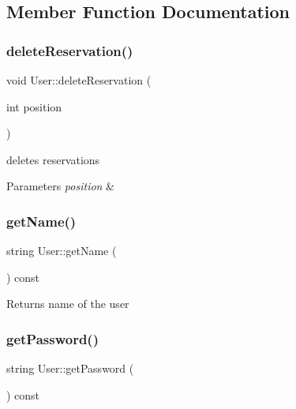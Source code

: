 \subsection{Member Function Documentation}
\hypertarget{class_user_a8f0bf6f9f7b1ded862b4531404068ade}{}\label{class_user_a8f0bf6f9f7b1ded862b4531404068ade} 
\subsubsection{\texorpdfstring{delete\+Reservation()}{deleteReservation()}}
{\footnotesize\ttfamily void User\+::delete\+Reservation (\begin{DoxyParamCaption}\item[{int}]{position }\end{DoxyParamCaption})}



deletes reservations 


\begin{DoxyParams}{Parameters}
{\em position} & \\
\hline
\end{DoxyParams}
\hypertarget{class_user_ab9b2b5feb6bdd1582696eb6d44cee384}{}\label{class_user_ab9b2b5feb6bdd1582696eb6d44cee384} 
\subsubsection{\texorpdfstring{get\+Name()}{getName()}}
{\footnotesize\ttfamily string User\+::get\+Name (\begin{DoxyParamCaption}{ }\end{DoxyParamCaption}) const\hspace{0.3cm}{\ttfamily [inline]}}

\begin{DoxyReturn}{Returns}
name of the user 
\end{DoxyReturn}
\hypertarget{class_user_a33429bdd1253091697a9c5c5e1448bee}{}\label{class_user_a33429bdd1253091697a9c5c5e1448bee} 
\subsubsection{\texorpdfstring{get\+Password()}{getPassword()}}
{\footnotesize\ttfamily string User\+::get\+Password (\begin{DoxyParamCaption}{ }\end{DoxyParamCaption}) const\hspace{0.3cm}{\ttfamily [inline]}}

